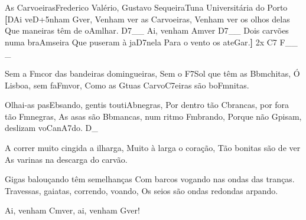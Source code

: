\begin{musica}{As Carvoeiras}{Frederico Valério, Gustavo Sequeira}{Tuna Universitária do Porto}
\textbf{[}\ac{D}{Ai} ve\ac{D+5}{nham} \ac{G}{ver},
Venham ver as Carvoeiras,
Venham ver os olhos delas
Que maneiras têm de o\ac{Am}{lhar}. \ac{D7}{}__
Ai, venham \ac{Am}{ver} \ac{D7}{}__
Dois carvões numa bra\ac{Am}{sei}ra
Que puseram à ja\ac{D7}{ne}la
Para o vento os ate\ac{G}{ar}.\textbf{]} 2x \ac{C7 F}{}__ _

Sem a \ac{Fm}{cor} das bandeiras domingueiras,
Sem o \ac{F7}{Sol} que têm as \ac{Bbm}{chi}tas,
Ó Lisboa, sem fa\ac{Fm}{vor},
Como as \ac{G}{tuas} Carvo\ac{C7}{ei}ras são bo\ac{Fm}{ni}tas.

Olhai-as pas\ac{Eb}{san}do, gentis touti\ac{Ab}{ne}gras,
Por dentro tão \ac{C}{bran}cas, por fora tão \ac{Fm}{ne}gras,
As asas são \ac{Bbm}{an}cas, num ritmo \ac{Fm}{bran}do,
Porque não \ac{G}{pi}sam, deslizam vo\ac{C}{a}n\ac{A7}{do}. \ac{D}{}_


A correr muito cingida a ilharga,
Muito à larga o coração,
Tão bonitas são de ver
As varinas na descarga do carvão.

Gigas balouçando têm semelhanças
Com barcos vogando nas ondas das tranças.
Travessas, gaiatas, correndo, voando,
Os seios são ondas redondas arpando.


Ai, venham \ac{Cm}{ve}r, ai, venham \ac{G}{ver}!

\end{musica}
